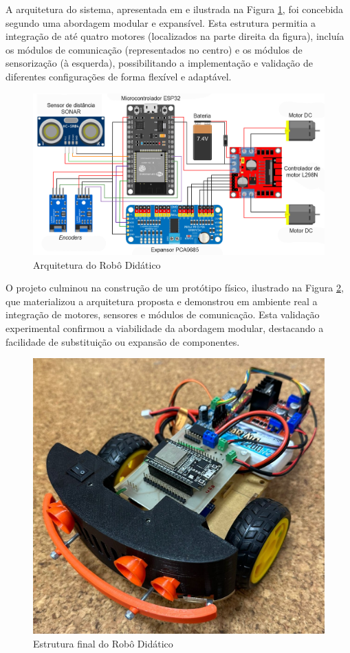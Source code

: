 A arquitetura do sistema, apresentada em \cite{didactic-robot-thesis} e ilustrada na Figura \ref{fig:arquitetura-robo-didatico}, foi concebida segundo uma abordagem modular e expansível. Esta estrutura permitia a integração de até quatro motores (localizados na parte direita da figura), incluía os módulos de comunicação (representados no centro) e os módulos de sensorização (à esquerda), possibilitando a implementação e validação de diferentes configurações de forma flexível e adaptável.

\begin{figure}[H]
    \centering
    \includegraphics[width=0.95\linewidth]{figuras/arquitetura_robo_didatico.png}
    \caption[Arquitetura do Robô Didático]{Arquitetura do Robô Didático \cite{didactic-robot-thesis}}
    \label{fig:arquitetura-robo-didatico}
\end{figure}

O projeto culminou na construção de um protótipo físico, ilustrado na Figura \ref{fig:estrutura-robo-didatico}, que materializou a arquitetura proposta e demonstrou em ambiente real a integração de motores, sensores e módulos de comunicação. Esta validação experimental confirmou a viabilidade da abordagem modular, destacando a facilidade de substituição ou expansão de componentes.  

\begin{figure}[H]
    \centering
    \includegraphics[width=0.5\linewidth]{figuras/robot-didatico.jpg}
    \caption[Estrutura final do Robô Didático]{Estrutura final do Robô Didático \cite{didactic-robot-thesis}}
    \label{fig:estrutura-robo-didatico}
\end{figure}

